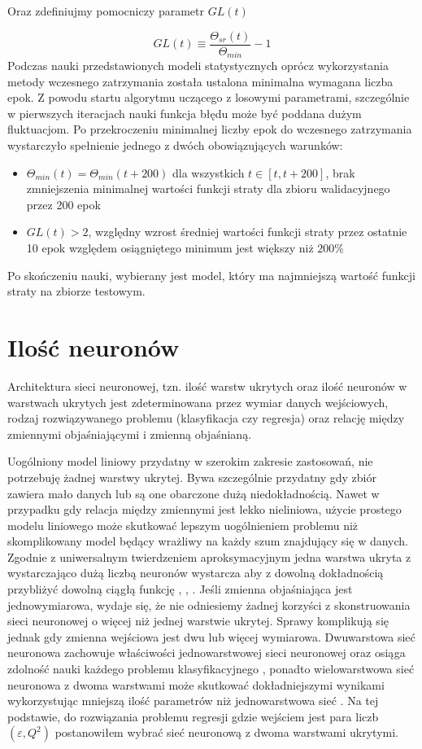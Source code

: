 \documentclass[11pt]{book}
\theoremstyle{definition}
\begin{document}
Oraz zdefiniujmy pomocniczy parametr $GL(t)$


$$
GL(t) \equiv \frac{\Theta_{sr}(t)}{\Theta_{min}} - 1
$$
Podczas nauki przedstawionych modeli statystycznych oprócz wykorzystania metody wczesnego zatrzymania została ustalona minimalna wymagana liczba epok. Z powodu startu algorytmu uczącego z losowymi parametrami, szczególnie w pierwszych iteracjach nauki funkcja błędu może być poddana dużym fluktuacjom. Po przekroczeniu minimalnej liczby epok do wczesnego zatrzymania wystarczyło spełnienie jednego z dwóch obowiązujących warunków:

\begin{itemize}
	\item $\Theta_{min}(t) = \Theta_{min}(t+ 200)$ dla wszystkich $t \in [t,t+200]$, brak zmniejszenia minimalnej wartości funkcji straty dla zbioru walidacyjnego przez 200 epok 
	\item $ GL(t)  > 2$, względny wzrost średniej wartości funkcji straty przez ostatnie 10 epok względem osiągniętego minimum jest większy niż $200\%$
\end{itemize}

Po skończeniu nauki, wybierany jest model, który ma najmniejszą wartość funkcji straty na zbiorze testowym.

\section{Ilość neuronów}

Architektura sieci neuronowej, tzn. ilość warstw ukrytych oraz ilość neuronów w warstwach ukrytych jest zdeterminowana przez wymiar danych wejściowych, rodzaj rozwiązywanego problemu (klasyfikacja czy regresja) oraz relację między zmiennymi objaśniającymi i zmienną objaśnianą.

Uogólniony model liniowy przydatny w szerokim zakresie zastosowań, nie potrzebuję żadnej warstwy ukrytej. Bywa szczególnie przydatny gdy zbiór zawiera mało danych lub są one obarczone dużą niedokładnością. Nawet w przypadku gdy relacja między zmiennymi jest lekko nieliniowa, użycie prostego modelu liniowego może skutkować lepszym uogólnieniem problemu niż skomplikowany model będący wrażliwy na każdy szum znajdujący się w danych. Zgodnie z uniwersalnym twierdzeniem aproksymacyjnym jedna warstwa ukryta z wystarczająco dużą liczbą neuronów wystarcza aby z dowolną dokładnością przybliżyć dowolną ciągłą funkcję \cite{Cybenko1989}, \cite{Hornik1989}, \cite{Leshno1993MultilayerFN}. Jeśli zmienna objaśniająca jest jednowymiarowa, wydaje się, że nie odniesiemy żadnej korzyści z skonstruowania sieci neuronowej o więcej niż jednej warstwie ukrytej. Sprawy komplikują się jednak gdy zmienna wejściowa jest dwu lub więcej wymiarowa. Dwuwarstowa sieć neuronowa zachowuje właściwości jednowarstwowej sieci neuronowej oraz osiąga zdolność nauki każdego problemu klasyfikacyjnego \cite{Bishop:2006:PRML}, ponadto wielowarstwowa sieć neuronowa z dwoma warstwami może skutkować dokładniejszymi wynikami wykorzystując mniejszą ilość parametrów niż jednowarstwowa sieć \cite{182704}. Na tej podstawie, do rozwiązania problemu regresji gdzie wejściem jest para liczb $(\varepsilon, Q^2)$ postanowiłem wybrać sieć neuronową z dwoma warstwami ukrytymi. 
\end{document}
